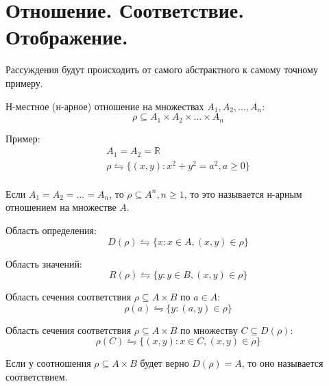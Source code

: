 \section{Отношение. Соответствие. Отображение.}
Рассуждения будут происходить от самого абстрактного к самому точному примеру.

\begin{definition}
Н-местное (н-арное) отношение на множествах $A_1,A_2,\ldots,A_{n}$: \[
\rho \subseteq A_1\times A_2\times \ldots\times A_n
\] 
\end{definition}

Пример:
\begin{gather*}
	A_1=A_2=\mathbb{R} \\
	\rho \leftrightharpoons \{(x,y): x^2+y^2=a^2, a\ge 0\} \\
\end{gather*}

\medskip

\begin{definition}
Если $A_1=A_2=\ldots=A_n$, то $\rho \subseteq A^{n}, n\ge 1$, то это называется
н-арным отношением на множестве $A$.
\end{definition}

\begin{definition}
Область определения: \[
D(\rho) \leftrightharpoons \{x: x \in A, (x,y) \in \rho\} 
\] 
\end{definition}

\begin{definition}
Область значений:
\[
R(\rho) \leftrightharpoons \{y: y \in B, (x,y) \in \rho\} 
\] 
\end{definition}

\begin{definition}
Область сечения соответствия $\rho \subseteq A\times B$ по $a \in A$: \[
\rho(a) \leftrightharpoons \{y: (a,y) \in \rho\} 
\] 
\end{definition}

\begin{definition}
Область сечения соответствия $\rho \subseteq A\times B$ по множеству $C\subseteq D(\rho)$:
 \[
\rho(C) \leftrightharpoons \{(x,y): x \in C, (x,y) \in \rho\} 
\] 
\end{definition}

\begin{definition}
Если у соотношения $\rho \subseteq A\times B$ будет верно $D(\rho) = A$, то оно называется
соответствием.
\end{definition}

